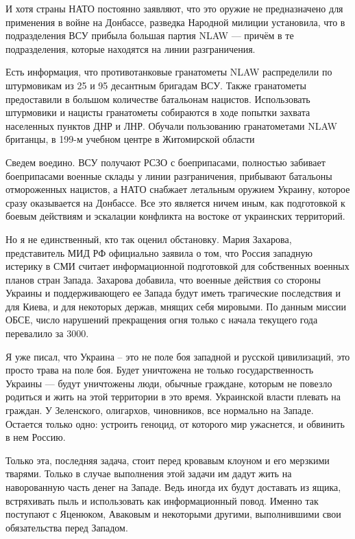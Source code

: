 И хотя страны НАТО постоянно заявляют, что это оружие не предназначено для
применения в войне на Донбассе, разведка Народной милиции установила, что в
подразделения ВСУ прибыла большая партия NLAW — причём в те подразделения,
которые находятся на линии разграничения.

Есть информация, что противотанковые гранатометы NLAW распределили по
штурмовикам из 25 и 95 десантным бригадам ВСУ. Также гранатометы предоставили в
большом количестве батальонам нацистов. Использовать штурмовики и нацисты
гранатометы собираются в ходе попытки захвата населенных пунктов ДНР и ЛНР.
Обучали пользованию гранатометами NLAW британцы, в 199-м учебном центре в
Житомирской области

Сведем воедино. ВСУ получают РСЗО с боеприпасами, полностью забивает
боеприпасами военные склады у линии разграничения, прибывают батальоны
отмороженных нацистов, а НАТО снабжает летальным оружием Украину, которое сразу
оказывается на Донбассе. Все это является ничем иным, как подготовкой к боевым
действиям и эскалации конфликта на востоке от украинских территорий.

Но я не единственный, кто так оценил обстановку. Мария Захарова, представитель
МИД РФ официально заявила о том, что Россия западную истерику в СМИ считает
информационной подготовкой для собственных военных планов стран Запада.
Захарова добавила, что военные действия со стороны Украины и поддерживающего ее
Запада будут иметь трагические последствия и для Киева, и для некоторых держав,
мнящих себя мировыми. По данным миссии ОБСЕ, число нарушений прекращения огня
только с начала текущего года перевалило за 3000.

Я уже писал, что Украина – это не поле боя западной и русской цивилизаций, это
просто трава на поле боя. Будет уничтожена не только государственность Украины
— будут уничтожены люди, обычные граждане, которым не повезло родиться и жить
на этой территории в это время. Украинской власти плевать на граждан. У
Зеленского, олигархов, чиновников, все нормально на Западе. Остается только
одно: устроить геноцид, от которого мир ужаснется, и обвинить в нем Россию.

Только эта, последняя задача, стоит перед кровавым клоуном и его мерзкими
тварями. Только в случае выполнения этой задачи им дадут жить на наворованную
часть денег на Западе. Ведь иногда их будут доставать из ящика, встряхивать
пыль и использовать как информационный повод. Именно так поступают с Яценюком,
Аваковым и некоторыми другими, выполнившими свои обязательства перед Западом.

